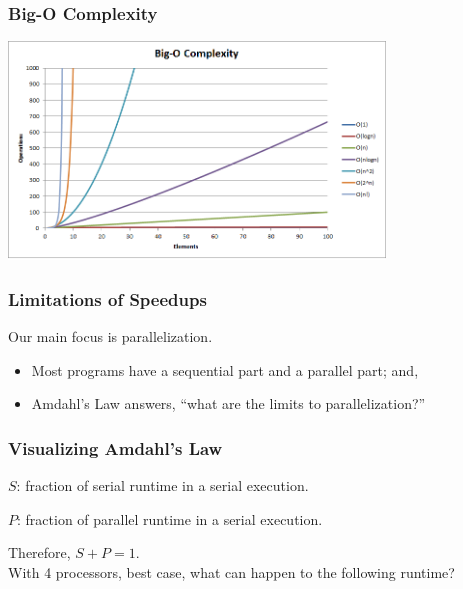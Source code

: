 \begin{frame}
\frametitle{Big-O Complexity}
\begin{center}
	\includegraphics[width=0.75\textwidth]{images/big-o-complexity}
\end{center}

\end{frame}

\begin{frame}
  \frametitle{Limitations of Speedups}

    Our main focus is parallelization.\\[1em]
  \begin{itemize}
    \item Most programs have a sequential part and a parallel part; and,\\[1em]
    \item Amdahl's Law answers, ``what are the limits to parallelization?''
  \end{itemize}

\end{frame}



\begin{frame}
\frametitle{Visualizing Amdahl's Law}
  \hspace*{2em}\begin{minipage}{.8\textwidth}
  $S$: fraction of serial runtime in a serial execution.

  $P$: fraction of parallel runtime in a serial execution.

  Therefore, $S + P = 1$.\\[2em]

  With 4 processors, best case, what can happen to the following runtime?
  \end{minipage}

\begin{changemargin}{-2cm}
  \hspace*{5em}
  \end{changemargin}
\end{frame}

